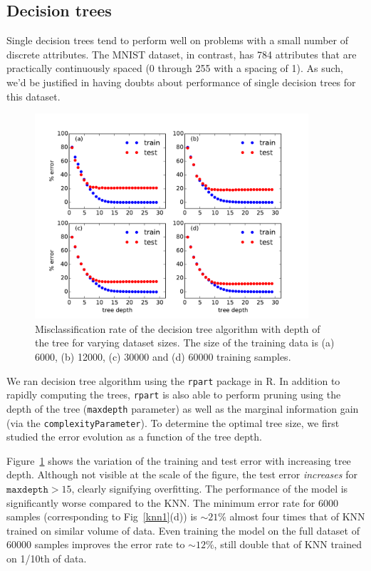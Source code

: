 \documentclass[10pt,letterpaper]{article}
\begin{document}
\subsection{Decision trees}
Single decision trees tend to perform well on problems with a small number of discrete attributes. The MNIST dataset, in contrast, has 784 attributes that are practically continuously spaced (0 through 255 with a spacing of 1). As such, we'd be justified in having doubts about performance of single decision trees for this dataset. 
\begin{figure}[tbp]
	\begin{center}
	\includegraphics[width=4in]{../results/mnist/dtree/error_vs_depth.pdf}
	\end{center}
	\caption{Misclassification rate of the decision tree algorithm with depth of the tree for varying dataset sizes. The size of the training data is (a) 6000, (b) 12000, (c) 30000 and (d) 60000 training samples.\label{dtree1}}
\end{figure}

We ran decision tree algorithm using the {\tt rpart} package in R. In addition to rapidly computing the trees, {\tt rpart} is also able to perform pruning using the depth of the tree ({\tt maxdepth} parameter) as well as the marginal information gain (via the {\tt complexityParameter}). To determine the optimal tree size, we first studied the error evolution as a function of the tree depth. 

Figure~\ref{dtree1} shows the variation of the training and test error with increasing tree depth. Although not visible at the scale of the figure, the test error {\em increases} for $\texttt{maxdepth}>15$, clearly signifying overfitting. The performance of the model is significantly worse compared to the KNN. The minimum error rate for 6000 samples (corresponding to Fig~\ref{knn1}(d)) is $\sim21\%$ almost four times that of KNN trained on similar volume of data. Even training the model on the full dataset of 60000 samples improves the error rate to $\sim12\%$, still double that of KNN trained on 1/10th of data. 
\end{document}
